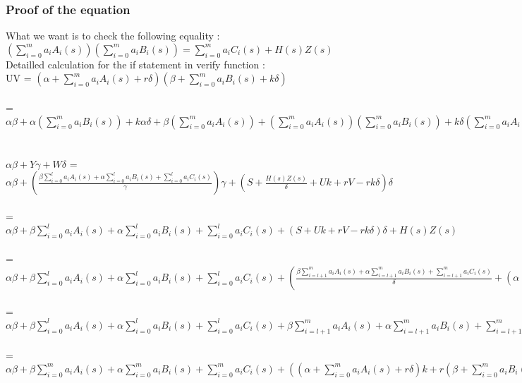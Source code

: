 \subsubsection{Proof of the equation}
\label{sec:EquationProofNotInZK} 
What we want is to check the following equality : $(\sum_{i=0}^m a_i A_i(s)) (\sum_{i=0}^m a_i B_i(s)) = \sum_{i=0}^m a_i C_i(s) + H(s) Z(s)$
\\Detailled calculation for the if statement in verify function :
\\ UV = $(\alpha + \sum_{i=0}^{m} a_i A_i (s) + r\delta ) (\beta + \sum_{i=0}^{m} a_i B_i (s) + k\delta )$
\\
\\ = $\alpha\beta + \alpha(\sum_{i=0}^{m} a_i B_i (s)) + k\alpha\delta + \beta(\sum_{i=0}^{m} a_i A_i (s))+ (\sum_{i=0}^{m} a_i A_i (s))(\sum_{i=0}^{m} a_i B_i (s)) + k\delta(\sum_{i=0}^{m} a_i A_i (s)) + r\delta\beta + r\delta(\sum_{i=0}^{m} a_i B_i (s)+ rk\delta\delta$
\\
\\
\\ $\alpha \beta + Y \gamma +  W\delta$ = $\alpha \beta + (\frac{\beta \sum_{i=0}^{l} a_i A_i (s) + \alpha \sum_{i=0}^{l} a_i B_i(s) + \sum_{i=0}^{l} a_i C_i(s) }{\gamma}) \gamma  + (S + \frac{H(s)Z(s)}{\delta} + Uk + rV - rk\delta) \delta$
\\
\\ = $\alpha \beta + \beta \sum_{i=0}^{l} a_i A_i (s) + \alpha \sum_{i=0}^{l} a_i B_i(s) + \sum_{i=0}^{l} a_i C_i(s)  + (S + Uk + rV - rk\delta) \delta + H(s)Z(s)$
\\
\\ = $\alpha \beta + \beta \sum_{i=0}^{l} a_i A_i (s) + \alpha \sum_{i=0}^{l} a_i B_i(s) + \sum_{i=0}^{l} a_i C_i(s)  + (\frac{\beta \sum_{i=l+1}^m a_i A_i(s) + \alpha \sum_{i=l+1}^m a_i B_i(s) + \sum_{i=l+1}^m a_i C_i(s)}{\delta} + (\alpha + \sum_{i=0}^{m} a_i A_i (s) + r\delta)k + r(\beta + \sum_{i=0}^{m} a_i B_i (s) + k\delta) - rk\delta) \delta + H(s)Z(s)$
\\
\\ = $\alpha \beta + \beta \sum_{i=0}^{l} a_i A_i (s) + \alpha \sum_{i=0}^{l} a_i B_i(s) + \sum_{i=0}^{l} a_i C_i(s)  + \beta \sum_{i=l+1}^m a_i A_i(s) + \alpha \sum_{i=l+1}^m a_i B_i(s) + \sum_{i=l+1}^m a_i C_i(s) + ((\alpha + \sum_{i=0}^{m} a_i A_i (s) + r\delta)k + r(\beta + \sum_{i=0}^{m} a_i B_i (s) + k\delta) - rk\delta) \delta + H(s)Z(s)$
\\
\\ = $\alpha \beta + \beta \sum_{i=0}^{m} a_i A_i (s) + \alpha \sum_{i=0}^{m} a_i B_i(s) + \sum_{i=0}^{m} a_i C_i(s) + ((\alpha + \sum_{i=0}^{m} a_i A_i (s) + r\delta)k + r(\beta + \sum_{i=0}^{m} a_i B_i (s) + k\delta) - rk\delta) \delta + H(s)Z(s)$
